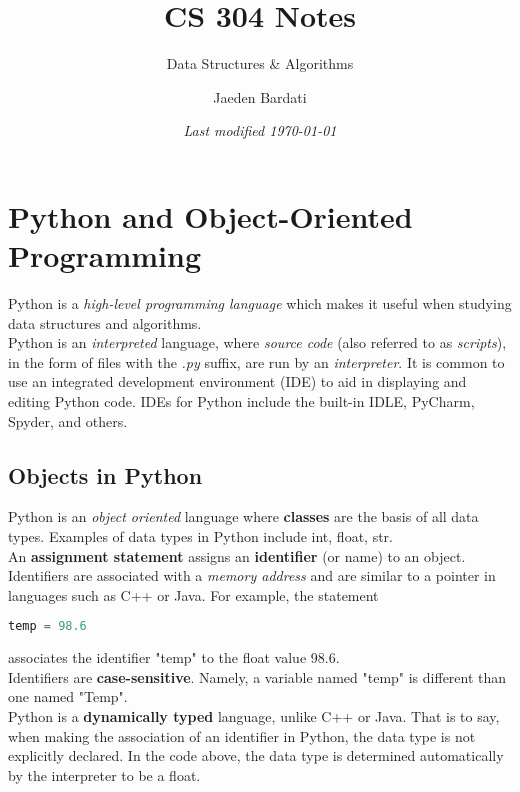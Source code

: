\documentclass[]{article}
\title{CS 304 Notes}
\subtitle{Data Structures \& Algorithms}
\author{Jaeden Bardati}
\date{\textit{Last modified \today}}
\begin{document}
\maketitle
\bigbreak

\section{Python and Object-Oriented Programming}
\bigbreak

Python is a \textit{high-level programming language} which makes it useful when studying data structures and algorithms.\\

Python is an \textit{interpreted} language, where \textit{source code} (also referred to as \textit{scripts}), in the form of files with the \textit{.py} suffix, are run by an \textit{interpreter}. It is common to use an integrated development environment (IDE) to aid in displaying and editing Python code. IDEs for Python include the built-in IDLE, PyCharm, Spyder, and others.\\

\subsection{Objects in Python}

Python is an \textit{object oriented} language where \textbf{classes} are the basis of all data types. Examples of data types in Python include int, float, str.\\

An \textbf{assignment statement} assigns an \textbf{identifier} (or name) to an object. Identifiers are associated with a \textit{memory address} and are similar to a pointer in languages such as C++ or Java. For example, the statement 

\begin{lstlisting}[language=Python]
	temp = 98.6
\end{lstlisting}
associates the identifier "temp" to the float value 98.6.\\

Identifiers are \textbf{case-sensitive}. Namely, a variable named "temp" is different than one named "Temp". \\

Python is a \textbf{dynamically typed} language, unlike C++ or Java. That is to say, when making the association of an identifier in Python, the data type is not explicitly declared. In the code above, the data type is determined automatically by the interpreter to be a float.\\
\end{document}
